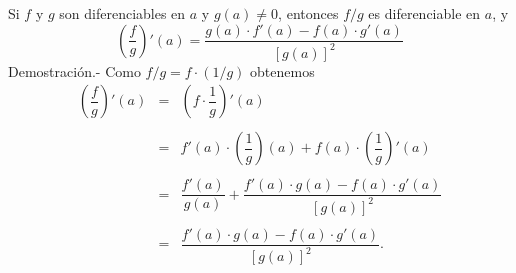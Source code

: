 \begin{teo}
    Si $f$ y $g$ son diferenciables en $a$ y $g(a)\neq 0$, entonces $f/g$ es diferenciable en $a$, y
    $$\left(\dfrac{f}{g}\right)'(a)=\dfrac{g(a)\cdot f'(a)-f(a)\cdot g'(a)}{\left[g(a)\right]^2}$$
	Demostración.-\; Como $f/g=f\cdot (1/g)$ obtenemos
	$$\begin{array}{rcl}
	    \left(\dfrac{f}{g}\right)'(a) &=& \left(f\cdot \dfrac{1}{g}\right)'(a)\\\\
					  &=& f'(a)\cdot \left(\dfrac{1}{g}\right)(a)+f(a)\cdot \left(\dfrac{1}{g}\right)'(a)\\\\
					  &=& \dfrac{f'(a)}{g(a)}+\dfrac{f'(a)\cdot g(a)-f(a)\cdot g'(a)}{\left[g(a)\right]^2}\\\\
					  &=& \dfrac{f'(a)\cdot g(a)-f(a)\cdot g'(a)}{\left[g(a)\right]^2}.\\\\
	\end{array}$$
\end{teo}
\vspace{.7cm}

